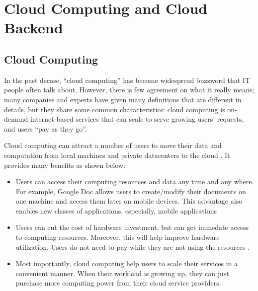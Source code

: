 \section{Cloud Computing and Cloud Backend}
\label{bg-cloud}

\subsection{Cloud Computing}

In the past decase, ``cloud computing'' has become widespread buzzword that IT
people often talk about. However, there is few agreement on what it really
means; many companies and experts have given many definitions
\cite{TwentyoneCloudDef, IBMCloudDef, PCMagCloudDef, Foster+08-CloudAndGrid}
that are different in details, but they share some common characteristics: cloud
computing is on-demand internet-based services that can scale to serve growing
users' requests, and users ``pay as they go''.


Cloud computing can attract a number of users to move their data and
computation from local machines and private datacenters to the cloud
\cite{AdobeCloudStat, AWSCustomer, GmailStat, GoogleDriveStat, DropboxStat,
AstroInCloud, FacebookStat, Luo+16-BigDataBioResearch}.
It provides many benefits as shown below:
\begin{itemize}
\item Users can access their computing resources and data any time and any
where. For example, Google Doc allows users to create/modify their documents on
one machine and access them later on mobile devices. This advantage also
enables new classes of applications, especially, mobile applications
\cite{DropboxWebsite, GmailWebsite, GoogleDriveWebsite, iCloudWebsite,
SiriWebsite} 

\item Users can cut the cost of hardware investment, but can get immedate access
to computing resources. Moreover, this will help improve hardware utilization.
Users do not need to pay while they are not using the resources
\cite{Marston+11-CloudBusiness}.

\item Most importantly, cloud computing help users to scale their services in a
convenient manner. When their workload is growing up, they can just purchase
more computing power from their cloud service providers.
\end{itemize}

